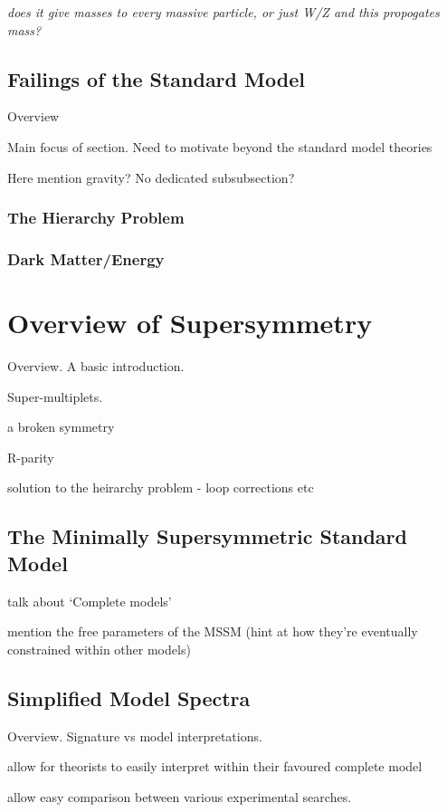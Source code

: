 \emph{does it give masses to every massive particle, or just W/Z and this 
propogates mass?}

\subsection{Failings of the Standard Model}
Overview

Main focus of section. Need to motivate beyond the standard model theories

Here mention gravity? No dedicated subsubsection?

\subsubsection{The Hierarchy Problem}
\subsubsection{Dark Matter/Energy}


\section{Overview of Supersymmetry}  %
\label{sec:theory_overview}
Overview. A basic introduction.

Super-multiplets.

a broken symmetry

R-parity

solution to the heirarchy problem - loop corrections etc

\subsection{The Minimally Supersymmetric Standard Model}
talk about `Complete models'

mention the free parameters of the MSSM (hint at how they're eventually 
constrained within other models)


\subsection{Simplified Model Spectra}
Overview. Signature vs model interpretations.

allow for theorists to easily interpret within their favoured complete model

allow easy comparison between various experimental searches.

